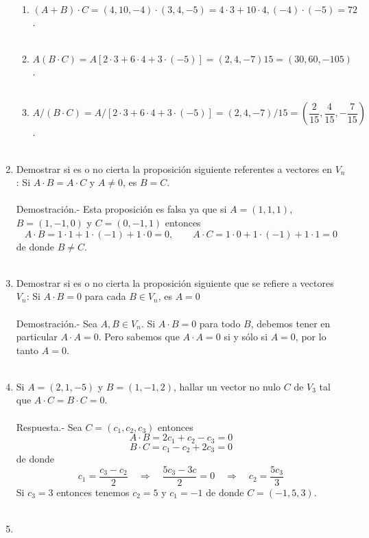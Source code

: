 \begin{enumerate}
\begin{enumerate}[\bfseries ]
    \item $(A+B)\cdot C = (4,10,-4)\cdot (3,4,-5) = 4\cdot 3 + 10 \cdot 4, (-4)\cdot (-5) = 72$.\\\\

    \item $A(B\cdot C) = A\left[2\cdot 3 + 6\cdot 4 + 3\cdot (-5)\right] = (2,4,-7)15 = (30,60,-105)$.\\\\

    \item $A/(B\cdot C) = A/\left[2\cdot 3 + 6\cdot 4 + 3\cdot (-5)\right] = (2,4,-7)/15 = \left(\dfrac{2}{15},\dfrac{4}{15},-\dfrac{7}{15}\right)$.\\\\

\end{enumerate}

\item Demostrar si es o no cierta la proposición siguiente referentes a vectores en $V_n$: Si $A\cdot B=A\cdot C$ y $A\neq 0$, es $B=C$.\\\\
    Demostración.-\; Esta proposición es falsa ya que si $A=(1,1,1)$, $B=(1,-1,0)$ y $C=(0,-1,1)$ entonces $$A\cdot B = 1\cdot 1 + 1\cdot(-1)+1\cdot 0 = 0, \qquad A\cdot C = 1\cdot 0 + 1\cdot(-1)+1\cdot 1 = 0$$
    de donde $B\neq C$.\\\\ 

\item Demostrar si es o no cierta la proposición siguiente que se refiere a vectores $V_n$: Si $A\cdot B = 0$ para cada $B \in V_n$, es $A=0$ \\\\ 
    Demostración.-\; Sea $A,B \in V_n$. Si $A\cdot B = 0$ para todo $B$,  debemos tener en particular $A\cdot A = 0$. Pero sabemos que $A\cdot A = 0$ si y sólo si $A=0$, por lo tanto $A=0$.\\\\

\item Si $A=(2,1,-5)$ y $B=(1,-1,2)$, hallar un vector no nulo $C$ de $V_3$ tal que $A\cdot C=B\cdot C=0$.\\\\
    Respuesta.-\; Sea $C=(c_1,c_2,c_3)$ entonces $$A\cdot B = 2c_1+c_2-c_3=0$$ $$B\cdot C = c_1-c_2+2c_3 = 0$$
	de donde $$c_1=\dfrac{c_3-c_2}{2}\quad \Longrightarrow \quad \dfrac{5c_3 - 3c}{2}=0 \quad \Longrightarrow \quad c_2 = \dfrac{5c_3}{3}$$
	Si $c_3=3$ entonces tenemos $c_2=5$ y $c_1=-1$ de donde $C=(-1,5,3)$.\\\\

\item 

\end{enumerate}
